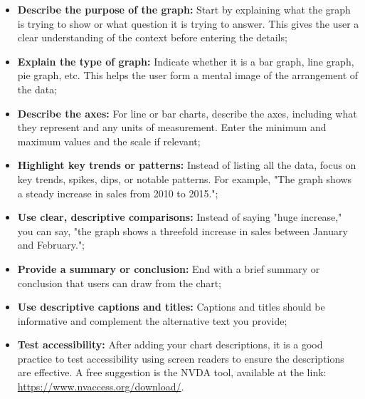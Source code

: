 \documentclass[12pt]{article}
\begin{document}
\begin{itemize}
  \item \textbf{Describe the purpose of the graph:} Start by explaining what the graph is trying to show or what question it is trying to answer. This gives the user a clear understanding of the context before entering the details;
    \item \textbf{Explain the type of graph:} Indicate whether it is a bar graph, line graph, pie graph, etc. This helps the user form a mental image of the arrangement of the data;
    \item \textbf{Describe the axes:} For line or bar charts, describe the axes, including what they represent and any units of measurement. Enter the minimum and maximum values and the scale if relevant;
    \item \textbf{Highlight key trends or patterns:} Instead of listing all the data, focus on key trends, spikes, dips, or notable patterns. For example, "The graph shows a steady increase in sales from 2010 to 2015.";
    \item \textbf{Use clear, descriptive comparisons:} Instead of saying "huge increase," you can say, "the graph shows a threefold increase in sales between January and February.";
    \item \textbf{Provide a summary or conclusion:} End with a brief summary or conclusion that users can draw from the chart;
    \item \textbf{Use descriptive captions and titles:} Captions and titles should be informative and complement the alternative text you provide;
    \item \textbf{Test accessibility:} After adding your chart descriptions, it is a good practice to test accessibility using screen readers to ensure the descriptions are effective. A free suggestion is the NVDA tool, available at the link: \url{https://www.nvaccess.org/download/}.
\end{itemize}
\end{document}
